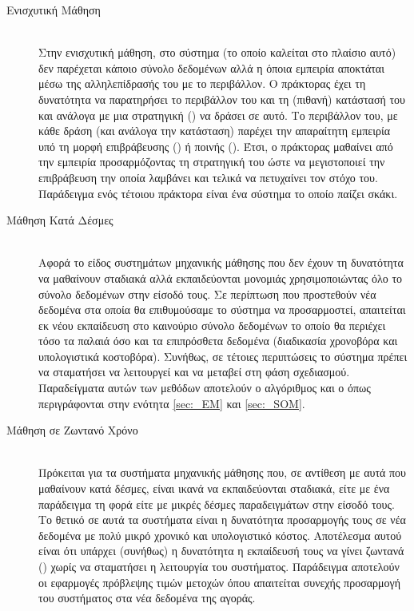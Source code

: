 \begin{description}
    \item[Ενισχυτική Μάθηση] \hfill \\ Στην ενισχυτική μάθηση, στο σύστημα (το οποίο καλείται  στο πλαίσιο αυτό) δεν παρέχεται κάποιο σύνολο δεδομένων αλλά η όποια εμπειρία αποκτάται μέσω της αλληλεπίδρασής του με το περιβάλλον. Ο πράκτορας έχει τη δυνατότητα να παρατηρήσει το περιβάλλον του και τη (πιθανή) κατάστασή του και ανάλογα με μια στρατηγική () να δράσει σε αυτό. Το περιβάλλον του, με κάθε δράση (και ανάλογα την κατάσταση) παρέχει την απαραίτητη εμπειρία υπό τη μορφή επιβράβευσης () ή ποινής (). Έτσι, ο πράκτορας μαθαίνει από την εμπειρία προσαρμόζοντας τη στρατηγική του ώστε να μεγιστοποιεί την επιβράβευση την οποία λαμβάνει και τελικά να πετυχαίνει τον στόχο του. Παράδειγμα ενός τέτοιου πράκτορα είναι ένα σύστημα το οποίο παίζει σκάκι.

    \item[Μάθηση Κατά Δέσμες] \hfill \\ Αφορά το είδος συστημάτων μηχανικής μάθησης που δεν έχουν τη δυνατότητα να μαθαίνουν σταδιακά αλλά εκπαιδεύονται μονομιάς χρησιμοποιώντας όλο το σύνολο δεδομένων στην είσοδό τους. Σε περίπτωση που προστεθούν νέα δεδομένα στα οποία θα επιθυμούσαμε το σύστημα να προσαρμοστεί, απαιτείται εκ νέου εκπαίδευση στο καινούριο σύνολο δεδομένων το οποίο θα περιέχει τόσο τα παλαιά όσο και τα επιπρόσθετα δεδομένα (διαδικασία χρονοβόρα και υπολογιστικά κοστοβόρα). Συνήθως, σε τέτοιες περιπτώσεις το σύστημα πρέπει να σταματήσει να λειτουργεί και να μεταβεί στη φάση σχεδιασμού. Παραδείγματα αυτών των μεθόδων αποτελούν ο αλγόριθμος  και ο  όπως περιγράφονται στην ενότητα \ref{sec:_EM} και \ref{sec:_SOM}.
    
    \item[Μάθηση σε Ζωντανό Χρόνο] \hfill \\ Πρόκειται για τα συστήματα μηχανικής μάθησης που, σε αντίθεση με αυτά που μαθαίνουν κατά δέσμες, είναι ικανά να εκπαιδεύονται σταδιακά, είτε με ένα παράδειγμα τη φορά είτε με μικρές δέσμες παραδειγμάτων στην είσοδό τους. Το θετικό σε αυτά τα συστήματα είναι η δυνατότητα προσαρμογής τους σε νέα δεδομένα με πολύ μικρό χρονικό και υπολογιστικό κόστος. Αποτέλεσμα αυτού είναι ότι υπάρχει (συνήθως) η δυνατότητα η εκπαίδευσή τους να γίνει ζωντανά () χωρίς να σταματήσει η λειτουργία του συστήματος. Παράδειγμα αποτελούν οι εφαρμογές πρόβλεψης τιμών μετοχών όπου απαιτείται συνεχής προσαρμογή του συστήματος στα νέα δεδομένα της αγοράς. 
    

\end{description}
